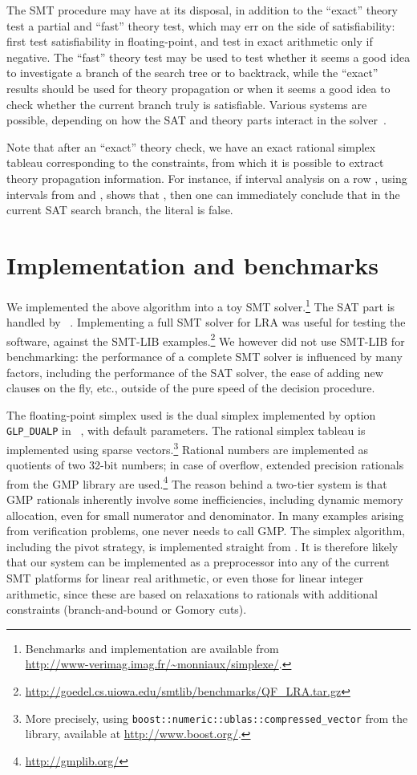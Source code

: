 The SMT procedure may have at its disposal, in addition to the ``exact'' theory test a partial and  ``fast'' theory test, which may err on the side of satisfiability: first test satisfiability in floating-point, and test in exact arithmetic only if negative. The ``fast'' theory test may be used to test whether it seems a good idea to investigate a branch of the search tree or to backtrack, while the ``exact'' results should be used for theory propagation or when it seems a good idea to check whether the current branch truly is satisfiable. Various systems are possible, depending on how the SAT and theory parts interact in the solver~\cite{Faure_et_al_SAT08}.

Note that after an ``exact'' theory check, we have an exact rational simplex tableau corresponding to the constraints, from which it is possible to extract theory propagation information. For instance, if interval analysis on a row , using intervals from  and , shows that , then one can immediately conclude that in the current SAT search branch, the literal  is false.

\section{Implementation and benchmarks}
We implemented the above algorithm into a toy SMT solver.\footnote{Benchmarks and implementation are available from\\
\url{http://www-verimag.imag.fr/~monniaux/simplexe/}.}
The SAT part is handled by ~\cite{Minisat_SAT03}. Implementing a full SMT solver for LRA was useful for testing the software, against the SMT-LIB examples.\footnote{\url{http://goedel.cs.uiowa.edu/smtlib/benchmarks/QF_LRA.tar.gz}}
We however did not use SMT-LIB for benchmarking: the performance of a complete SMT solver is influenced by many factors, including the performance of the SAT solver, the ease of adding new clauses on the fly, etc., outside of the pure speed of the decision procedure.

The floating-point simplex used is the dual simplex implemented by option \verb+GLP_DUALP+ in ~\cite{GLPK}, with default parameters.
The rational simplex tableau is implemented using sparse vectors.\footnote{More precisely, using \texttt{boost::numeric::ublas::compressed\_vector} from the  library, available at \url{http://www.boost.org/}.}
Rational numbers are implemented as quotients of two 32-bit numbers; in case of overflow, extended precision rationals from the GMP library \cite{GMP} are used.\footnote{\url{http://gmplib.org/}} The reason behind a two-tier system is that GMP rationals inherently involve some inefficiencies, including dynamic memory allocation, even for small numerator and denominator. In many examples arising from verification problems, one never needs to call GMP. The simplex algorithm, including the pivot strategy, is implemented straight from \cite{SRI-CSL-06-01,DBLP:conf/cav/DutertreM06}. It is therefore likely that our system can be implemented as a preprocessor into any of the current SMT platforms for linear real arithmetic, or even those for linear integer arithmetic, since these are based on relaxations to rationals with additional constraints (branch-and-bound or Gomory cuts).

